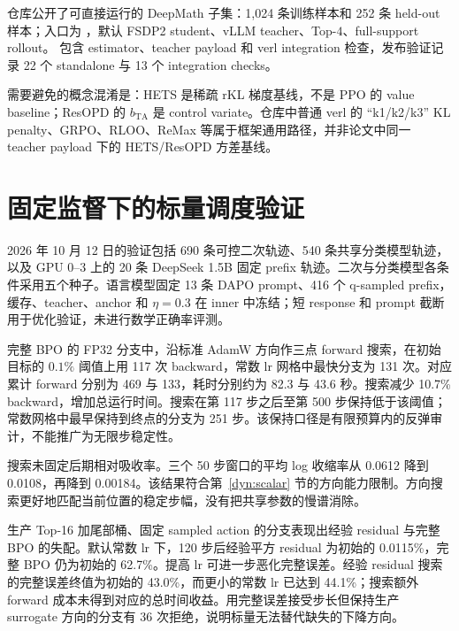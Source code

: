 \documentclass[lang=cn,scheme=chinese,openany]{../book/elegantbook}
\begin{document}
仓库公开了可直接运行的 DeepMath 子集：1,024 条训练样本和 252 条 held-out 样本；入口为 ，默认 FSDP2 student、vLLM teacher、Top-$4$、full-support rollout。 包含 estimator、teacher payload 和 verl integration 检查，发布验证记录 22 个 standalone 与 13 个 integration checks。

需要避免的概念混淆是：HETS 是稀疏 rKL 梯度基线，不是 PPO 的 value baseline；ResOPD 的 $b_{\mathrm{TA}}$ 是 control variate。仓库中普通 verl 的 ``k1/k2/k3'' KL penalty、GRPO、RLOO、ReMax 等属于框架通用路径，并非论文中同一 teacher payload 下的 HETS/ResOPD 方差基线。



\section{固定监督下的标量调度验证}
\label{evidence:scalar}

2026 年 10 月 12 日的验证包括 690 条可控二次轨迹、540 条共享分类模型轨迹，以及 GPU 0--3 上的 20 条 DeepSeek 1.5B 固定 prefix 轨迹。二次与分类模型各条件采用五个种子。语言模型固定 13 条 DAPO prompt、416 个 q-sampled prefix，缓存、teacher、anchor 和 $\eta=0.3$ 在 inner 中冻结；短 response 和 prompt 截断用于优化验证，未进行数学正确率评测。

完整 BPO 的 FP32 分支中，沿标准 AdamW 方向作三点 forward 搜索，在初始目标的 $0.1\%$ 阈值上用 117 次 backward，常数 lr 网格中最快分支为 131 次。对应累计 forward 分别为 469 与 133，耗时分别约为 82.3 与 43.6 秒。搜索减少 10.7\% backward，增加总运行时间。搜索在第 117 步之后至第 500 步保持低于该阈值；常数网格中最早保持到终点的分支为 251 步。该保持口径是有限预算内的反弹审计，不能推广为无限步稳定性。

搜索未固定后期相对吸收率。三个 50 步窗口的平均 log 收缩率从 0.0612 降到 0.0108，再降到 0.00184。该结果符合第~\ref{dyn:scalar} 节的方向能力限制。方向搜索更好地匹配当前位置的稳定步幅，没有把共享参数的慢谱消除。

生产 Top-16 加尾部桶、固定 sampled action 的分支表现出经验 residual 与完整 BPO 的失配。默认常数 lr 下，120 步后经验平方 residual 为初始的 0.0115\%，完整 BPO 仍为初始的 62.7\%。提高 lr 可进一步恶化完整误差。经验 residual 搜索的完整误差终值为初始的 43.0\%，而更小的常数 lr 已达到 44.1\%；搜索额外 forward 成本未得到对应的总时间收益。用完整误差接受步长但保持生产 surrogate 方向的分支有 36 次拒绝，说明标量无法替代缺失的下降方向。
\end{document}
